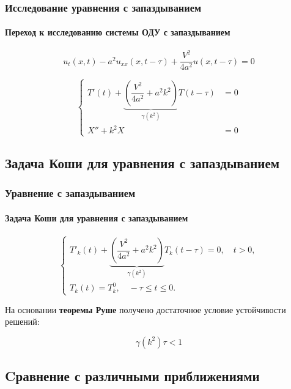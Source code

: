 \documentclass{beamer}
\numberwithin{equation}{section}
\begin{document}
    \begin{frame}
        \frametitle{Исследование уравнения с запаздыванием}
        \framesubtitle{Переход к исследованию системы ОДУ с запаздыванием}

        \begin{equation}
            u_t (x,t) - a^2 u_{xx} (x,t-\tau) + \dfrac{V^2}{4a^2} u (x,t-\tau) = 0
        \end{equation}

        \begin{equation}
            \left\{
            \begin{aligned}
                T'(t) + \underbrace{ \left( \dfrac{V^2}{4a^2} + a^2 k^2 \right)}_{\gamma(k^2)} T(t-\tau) & = 0\\
                X'' + k^2 X & = 0
            \end{aligned}
            \right.
        \end{equation}
    \end{frame}

    \subsection{Задача Коши для уравнения с запаздыванием}

    \begin{frame}
        \frametitle{Уравнение с запаздыванием}
        \framesubtitle{Задача Коши для уравнения с запаздыванием}

        \begin{equation}
            \left\{
            \begin{aligned}
                T'_k (t) + \underbrace{ \left( \dfrac{V^2}{4a^2} + a^2 k^2 \right)}_{\gamma(k^2)} T_k (t-\tau) = 0, \quad t>0,\\
                T_k (t) = T_{k}^{0}, \quad -\tau \leq t \leq 0.
            \end{aligned}
            \right.
        \end{equation}

        На основании \textbf{теоремы Руше} получено достаточное условие устойчивости решений:

        \begin{equation}
            \gamma(k^2) \tau < 1
        \end{equation}
    \end{frame}

    \subsection{Cравнение с различными приближениями}
\end{document}
